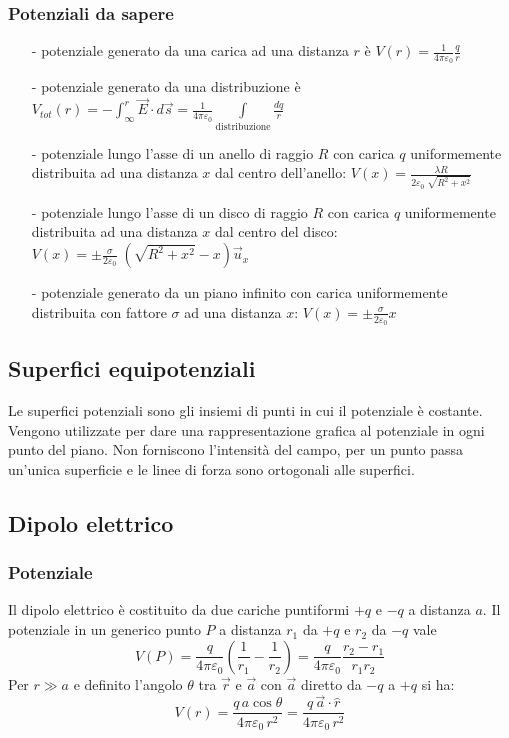 \documentclass[a4paper]{article}
\newcommand\ux{\vec{u}_x}
\begin{document}
\subsubsection*{Potenziali da sapere}
\begin{itemize}[topsep=3pt, itemsep=0pt]
	\item[-] potenziale generato da una carica ad una distanza \(r\) è \(\displaystyle V(r) = \frac{1}{4 \pi \varepsilon_0} \frac{q}{r}\)
	\item[-] potenziale generato da una distribuzione è \(\displaystyle V_{tot}(r) = -\int_{\infty}^r \vec{E} \cdot d\vec{s} = \frac{1}{4 \pi \varepsilon_0} \int \limits_\text{distribuzione} \frac{dq}{r}\)
	\item[-] potenziale lungo l'asse di un anello di raggio \(R\) con carica \(q\) uniformemente distribuita ad una distanza
	\(x\) dal centro dell'anello: \(\displaystyle V(x) = \frac{\lambda R}{2 \varepsilon_0 \; \sqrt{R^2 + x^2}}\)
	\item[-] potenziale lungo l'asse di un disco di raggio \(R\) con carica \(q\) uniformemente distribuita ad una distanza
	\(x\) dal centro del disco: \(\displaystyle V(x) = \pm \frac{\sigma}{2 \varepsilon_0} \; \left(\sqrt{R^2 + x^2} - x\right) \ux\)
	\item[-] potenziale generato da un piano infinito con carica uniformemente distribuita con fattore \(\sigma\) ad una distanza \(x\):
	\(\displaystyle V(x) = \pm \frac{\sigma}{2 \varepsilon_0} x\)
\end{itemize}

\subsection{Superfici equipotenziali}
Le superfici potenziali sono gli insiemi di punti in cui il potenziale è costante. Vengono utilizzate per dare una rappresentazione
grafica al potenziale in ogni punto del piano. Non forniscono l'intensità del campo, per un punto passa un'unica superficie e le
linee di forza sono ortogonali alle superfici.

\subsection{Dipolo elettrico}
\subsubsection*{Potenziale}
Il dipolo elettrico è costituito da due cariche puntiformi \(+q\) e \(-q\) a distanza \(a\). Il potenziale in un generico punto
\(P\) a distanza \(r_1\) da \(+q\) e \(r_2\) da \(-q\) vale 
\[V(P) = \frac{q}{4 \pi \varepsilon_0} \left(\frac{1}{r_1} - \frac{1}{r_2}\right) = \frac{q}{4 \pi \varepsilon_0} \frac{r_2 - r_1}{r_1 r_2}\]
Per \(r \gg a\) e definito l'angolo \(\theta\) tra \(\vec{r}\) e \(\vec{a}\) con \(\vec{a}\) diretto da \(-q\) a \(+q\) si ha:
\[V(r) = \frac{q \, a \cos\theta}{4 \pi \varepsilon_0 \, r^2} = \frac{q \, \vec{a} \cdot \hat{r}}{4 \pi \varepsilon_0 \, r^2}\]
\end{document}
